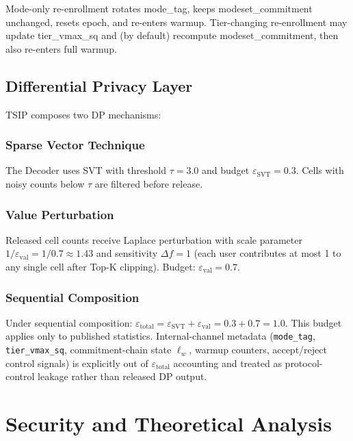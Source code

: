 \documentclass[conference]{IEEEtran}
\theoremstyle{definition}
\theoremstyle{plain}
\begin{document}
Mode-only re-enrollment rotates mode\_tag, keeps
modeset\_commitment unchanged, resets epoch, and re-enters warmup.
Tier-changing re-enrollment may update tier\_vmax\_sq and (by
default) recompute modeset\_commitment, then also re-enters full
warmup.

\subsection{Differential Privacy Layer}\label{sec:dp}

TSIP composes two DP mechanisms:

\subsubsection{Sparse Vector Technique}

The Decoder uses SVT with threshold $\tau = 3.0$ and budget $\varepsilon_{\mathrm{SVT}} = 0.3$. Cells with noisy counts below $\tau$ are filtered before release.

\subsubsection{Value Perturbation}

Released cell counts receive Laplace perturbation with scale parameter $1/\varepsilon_{\mathrm{val}} = 1/0.7 \approx 1.43$ and sensitivity $\Delta f = 1$ (each user contributes at most 1 to any single cell after Top-K clipping). Budget: $\varepsilon_{\mathrm{val}} = 0.7$.

\subsubsection{Sequential Composition}

Under sequential composition:
$\varepsilon_{\mathrm{total}} = \varepsilon_{\mathrm{SVT}} + \varepsilon_{\mathrm{val}} = 0.3 + 0.7 = 1.0$.
This budget applies only to published statistics. Internal-channel metadata
(\texttt{mode\_tag}, \texttt{tier\_vmax\_sq}, commitment-chain state $\ell_w$,
warmup counters, accept/reject control signals) is explicitly out of
$\varepsilon_{\mathrm{total}}$ accounting and treated as protocol-control
leakage rather than released DP output.

\section{Security and Theoretical Analysis}
\label{sec:security}
\end{document}
